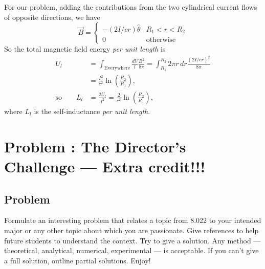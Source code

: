 \documentclass[solutions]{esg8022pset}
\begin{document}
  For our problem, adding the contributions from the two cylindrical
  current flows of opposite directions, we have
  \begin{equation}
    \vec{B} =
      \begin{cases}
        -(2I/cr) \hat{\theta} & R_1<r<R_2 \\
        0 & \text{otherwise}
      \end{cases}
  \end{equation}
  So the total magnetic field energy \emph{per unit length} is
  \begin{align*}
    U_{l} & = \int_{\text{Everywhere}} \frac{dV}{l} \frac{B^2}{8\pi}
      = \int_{R_1}^{R_2} 2\pi r\,dr \frac{(2I/cr)^2}{8\pi} \\
      & = \frac{I^2}{c^2}\ln\left(\frac{R_2}{R_1}\right),\\
    \text{so}\qquad L_{l} & = \frac{2U_{l}}{I^2}=\frac{2}{c^2}\ln{(\frac{R_2}{R_1})},
  \end{align*}
  where $L_{l}$ is the self-inductance \emph{per unit length}.
\section{Problem \thesection: The Director's Challenge --- Extra credit!!!}
\subsection{Problem}
  Formulate an interesting problem that relates a topic from 8.022 to your
  intended major or any other topic about which you are passionate.  Give references
  to help future students to understand the context.  Try to give a solution.
  Any method --- theoretical, analytical, numerical, experimental --- is acceptable.
  If you can't give a full solution, outline partial solutions. Enjoy!
\end{document}
